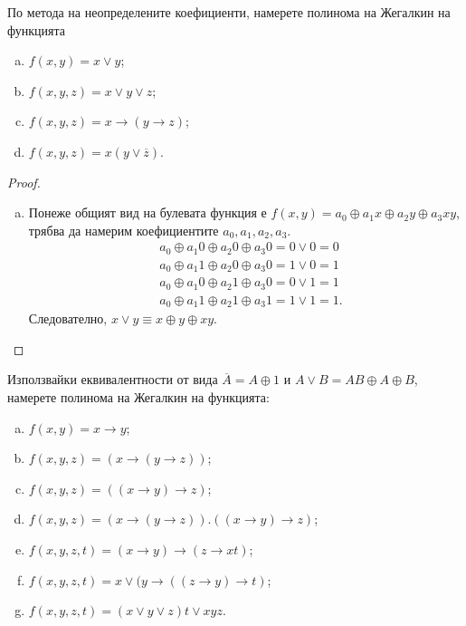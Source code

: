 \begin{problem}
  По метода на неопределените коефициенти, намерете полинома на Жегалкин на функцията 
  \begin{enumerate}[a)]
  \item
    $f(x,y) = x\vee y$;
  \item
    $f(x,y,z) = x\vee y \vee z$;
  \item
    $f(x,y,z) = x\rightarrow (y \rightarrow z)$;
  \item
    $f(x,y,z) = x(y\vee\overline{z})$.
  \end{enumerate}
\end{problem}
\begin{proof}
  \begin{enumerate}[a)]
  \item
    Понеже общият вид на булевата функция е $f(x,y) = a_0\oplus a_1 x \oplus a_2 y \oplus a_3 xy $,
    трябва да намерим коефициентите $a_0,a_1,a_2,a_3$.
    \begin{align*}
      & a_0\oplus a_1 0 \oplus a_2 0 \oplus a_3 0 = 0 \vee 0 = 0\\
      & a_0\oplus a_1 1 \oplus a_2 0 \oplus a_3 0 = 1 \vee 0 = 1\\
      & a_0\oplus a_1 0 \oplus a_2 1 \oplus a_3 0 = 0 \vee 1 = 1\\
      & a_0\oplus a_1 1 \oplus a_2 1 \oplus a_3 1 = 1 \vee 1 = 1.
    \end{align*}
    Следователно, $x\vee y \equiv x\oplus y\oplus xy$.
  \end{enumerate}
\end{proof}

\begin{problem}
  Използвайки еквивалентности от вида $\overline{A} = A\oplus 1$ и $A\vee B = AB\oplus A\oplus B$, 
  намерете полинома на Жегалкин на функцията:
  \begin{enumerate}[a)]
  \item
    $f(x,y) = x\rightarrow y$;
  \item
    $f(x,y,z) = (x\rightarrow (y\rightarrow z))$;
  \item
    $f(x,y,z) = ((x\rightarrow y)\rightarrow z)$;
  \item
    $f(x,y,z) = (x\rightarrow (y\rightarrow z)).((x\rightarrow y)\rightarrow z)$;
  \item
    $f(x,y,z,t) = (x\rightarrow y)\rightarrow (z\rightarrow xt)$;
  \item
    $f(x,y,z,t) = x\vee (y\rightarrow ((z\rightarrow y)\rightarrow t)$;
  \item
    $f(x,y,z,t) = (x\vee y\vee z)t \vee xyz$.
  \end{enumerate}
\end{problem}

